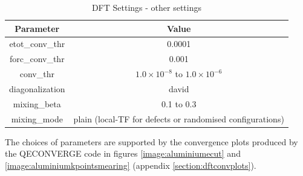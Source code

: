 \begin{table}[h]
\begin{center}
\renewcommand{\arraystretch}{1.2}
\begin{tabular}{c c}
\hline\hline
Parameter & Value \\
\hline\hline
etot\_conv\_thr & 0.0001 \\
forc\_conv\_thr & 0.001 \\ 
conv\_thr & $1.0 \times 10^{-8}$ to $1.0 \times 10^{-6}$ \\ 
diagonalization & david \\ 
mixing\_beta & 0.1 to 0.3 \\ 
mixing\_mode & plain (local-TF for defects or randomised configurations) \\ 
\hline\hline
\end{tabular}
\end{center}
\caption{DFT Settings - other settings}
\label{table:dftsettingsb}
\end{table}

\FloatBarrier

The choices of parameters are supported by the convergence plots produced by the QECONVERGE code in figures \ref{image:aluminiumecut} and \ref{image:aluminiumkpointsmearing} (appendix \ref{section:dftconvplots}).


